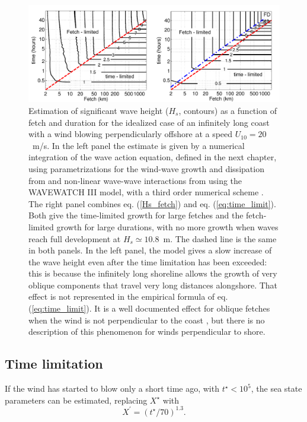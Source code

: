 \begin{figure}[htb]
\centerline{\includegraphics[width=\textwidth]{FIGS_CH_FETCH/fetch_time_lim_contours.pdf}}
 \caption{Estimation of significant wave height ($H_s$, contours) as a function of fetch and duration for the idealized case of an infinitely long coast 
with a wind blowing perpendicularly offshore at a speed $U_{10}=20$~m/s. In the left panel the estimate is given by a numerical integration of 
the wave action equation, defined in the next 
chapter, using parametrizations for the wind-wave growth and dissipation from \cite{Rascle&Ardhuin2013} and non-linear wave-wave interactions 
from \cite{Hasselmann&al.1985b} using the WAVEWATCH III model, with a third order numerical scheme \cite{Tolman1995b}. The right panel combines eq. 
(\ref{Hs_fetch}) and eq. (\ref{eq:time_limit}). Both give the time-limited growth for large fetches and the 
fetch-limited growth for large durations, with no more growth when waves reach full development at $H_s \simeq 10.8$~m. The dashed line is the same in both panels. 
In the left panel, the model gives a slow increase of the wave height even after the time limitation has been exceeded: this is because the infinitely long shoreline allows 
the growth of very oblique components that travel very long distances alongshore. That effect is not represented in the empirical formula of eq. (\ref{eq:time_limit}). 
It is a well documented effect for oblique fetches when the wind is not perpendicular to the coast \citep{Ardhuin&al.2007}, but there is no description of 
this phenomenon for winds perpendicular to shore. \label{fetch_time}}
\end{figure}

\subsection{Time limitation}
If the wind has started to blow only a short time ago, with $t^\star < 10^5$, the sea state parameters 
can be estimated, replacing $X^\star$ with
\begin{equation}
X^\prime = (t^\star/70)^{1.3}. \label{eq:time_limit}
\end{equation} 

